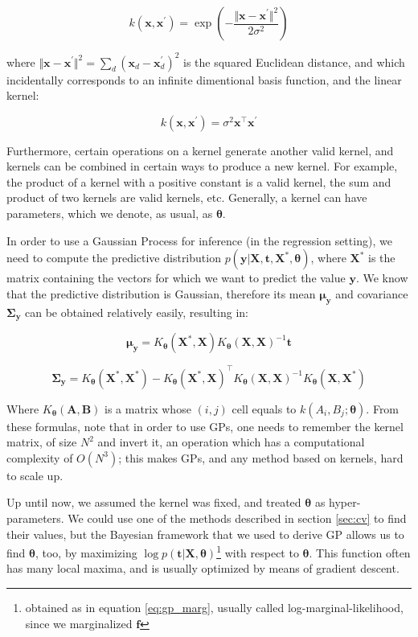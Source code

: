 \documentclass[12pt]{book}
\begin{document}
\begin{equation}
k(\bm x, \bm x^\prime)=\exp\left(-\frac{\Vert\bm x-\bm x^\prime\Vert^2}{2\sigma^2}\right)
\end{equation}

where $\Vert\bm x-\bm x^\prime\Vert^2=\sum_d(\bm x_d-\bm x_d^\prime)^2$ is the squared Euclidean distance, and which incidentally corresponds to an infinite dimentional basis function, and the linear kernel:

\begin{equation}
k(\bm x, \bm x^\prime)=\sigma^2\bm x^\intercal\bm x^\prime
\end{equation}

Furthermore, certain operations on a kernel generate another valid kernel, and kernels can be combined in certain ways to produce a new kernel. For example, the product of a kernel with a positive constant is a valid kernel, the sum and product of two kernels are valid kernels, etc. Generally, a kernel can have parameters, which we denote, as usual, as $\bm\theta$.

In order to use a Gaussian Process for inference (in the regression setting), we need to compute the predictive distribution $p(\bm y\vert\bm X, \bm t, \bm X^*,\bm\theta) $, where $\bm X^*$ is the matrix containing the vectors for which we want to predict the value $\bm y$. We know that the predictive distribution is Gaussian, therefore its mean $\bm\mu_{\bm y}$ and covariance $\bm\Sigma_{\bm y}$ can be obtained relatively easily, resulting in:

\begin{equation}
\label{eq:gp_pred_mean}
\bm\mu_{\bm y}=K_{\bm\theta}(\bm X^*,\bm X) K_{\bm\theta}(\bm X,\bm X)^{-1}\bm t
\end{equation}

\begin{equation}
\bm\Sigma_{\bm y}=K_{\bm\theta}(\bm X^*,\bm X^*)-K_{\bm\theta}(\bm X^*,\bm X)^\intercal K_{\bm\theta}(\bm X, \bm X)^{-1}K_{\bm\theta}(\bm X,\bm X^*)
\end{equation}

Where $K_{\bm\theta}(\bm A,\bm B)$ is a matrix whose $(i,j)$ cell equals to $k(A_i,B_j;\bm\theta)$. From these formulas, note that in order to use GPs, one needs to remember the kernel matrix, of size $N^2$ and invert it, an operation which has a computational complexity of $O(N^3)$; this makes GPs, and any method based on kernels, hard to scale up.

Up until now, we assumed the kernel was fixed, and treated $\bm\theta$ as hyper-parameters. We could use one of the methods described in section \ref{sec:cv} to find their values, but the Bayesian framework that we used to derive GP allows us to find $\bm\theta$, too, by maximizing $\log p(\bm t\vert\bm X,\bm\theta)$\footnote{obtained as in equation \ref{eq:gp_marg}, usually called log-marginal-likelihood, since we marginalized $\bm f$} with respect to $\bm\theta$. This function often has many local maxima, and is usually optimized by means of gradient descent.
\end{document}
